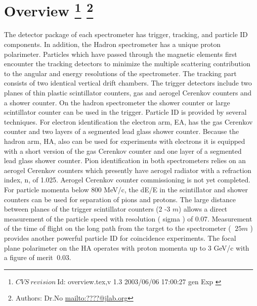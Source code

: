 \section[Overview]{Overview
\footnote{
  $CVS~revision~ $Id: overview.tex,v 1.3 2003/06/06 17:00:27 gen Exp $ $
}
\footnote{Authors: Dr.No \url{mailto:????@jlab.org}}
}

The detector package of each spectrometer has trigger, tracking, and particle 
ID components. In addition, the Hadron spectrometer has a unique
proton polarimeter. Particles 
which have passed through the magnetic 
elements first encounter the tracking detectors to  minimize 
the multiple scattering contribution to the angular and 
energy resolutions of the spectrometer. The tracking part consists of 
two identical vertical drift chambers. The trigger detectors include two planes of
thin plastic scintillator counters, gas and aerogel Cerenkov
counters and a shower 
counter. On the hadron spectrometer the shower counter or large scintillator counter 
can be used in the trigger. Particle ID is provided by several techniques. 
For electron identification the electron arm, EA, has the gas
Cerenkov counter and two layers of a segmented 
lead glass shower counter. Because the hadron arm, HA, also can
be used for experiments with electrons 
it is equipped with a short version of the gas Cerenkov counter
and one layer of a segmented 
lead glass shower counter. Pion identification in both
spectrometers relies on an aerogel 
Cerenkov counters which presently have aerogel radiator
with a refraction index, n, of 1.025. 
Aerogel Cerenkov counter commissioning is not yet completed. For particle momenta  
below 800 MeV/c, the dE/E in the scintillator and shower counters can be used for 
separation of pions and protons. The large distance between
planes of the trigger scintillator 
counters (2 -3 $m$) allows a direct measurement of the particle
speed with resolution ( sigma )
of 0.07. Measurement of the time of flight on the long path from the target to the 
spectrometer ( $~ 25 m$ ) provides another powerful particle ID
for coincidence experiments.
The focal plane polarimeter on the HA operates with proton
momenta up to 3 GeV/c with a figure of merit $~ 0.03$.\\


